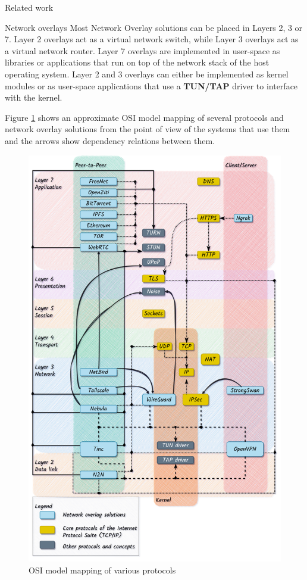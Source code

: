 \begin{frame}[fragile]{Related work}
\begin{block}{Network overlays}
\protect\hypertarget{thesis__020-related-work.md__network-overlays}{}
Most Network Overlay solutions can be placed in Layers 2, 3 or 7. Layer
2 overlays act as a virtual network switch, while Layer 3 overlays act
as a virtual network router. Layer 7 overlays are implemented in
user-space as libraries or applications that run on top of the network
stack of the host operating system. Layer 2 and 3 overlays can either be
implemented as kernel modules or as user-space applications that use a
\textbf{TUN/TAP} driver to interface with the kernel.

Figure \ref{osi-map-overlays} shows an approximate OSI model mapping of
several protocols and network overlay solutions from the point of view
of the systems that use them and the arrows show dependency relations
between them.

\begin{figure}
\centering
\includegraphics[width=\textwidth,height=0.9\textheight]{thesis/../figures/osi-map-overlays.drawio.png}
\caption{OSI model mapping of various protocols
\label{osi-map-overlays}}
\end{figure}


\end{block}
\end{frame}
